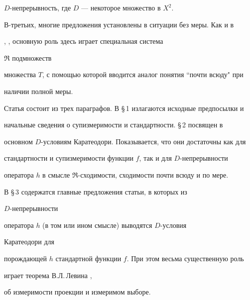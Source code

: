 $D$-непрерывность, где $D$ --- некоторое множество в $X^2$.





В-третьих, многие предложения установлены в ситуации без меры. Как и в


\cite{Sh1}, \cite{Sh2}, основную роль здесь играет специальная система


$\Re$ подмножеств


множества $T$, с помощью которой вводится аналог понятия ``почти всюду" при


наличии полной меры.





Статья состоит из трех параграфов. В \S\,1 излагаются исходные предпосылки и


начальные сведения о супизмеримости и стандартности. \S\,2 посвящен в


основном $D$-условиям Каратеодори. Показывается, что они достаточны как для


стандартности и супизмеримости функции $f$, так и для $D$-непрерывности


оператора $h$ в смысле $\Re$-сходимости, сходимости почти всюду и по мере.





В \S\,3 содержатся главные предложения статьи, в которых из


$D$-непрерывности


оператора $h$ (в том или ином смысле) выводятся $D$-условия


Каратеодори для


порождающей $h$ стандартной функции $f$. При этом весьма существенную роль


играет теорема В.Л.\,Левина \cite{Lev1}, \cite{Lev2}


об измеримости проекции и измеримом выборе.


















